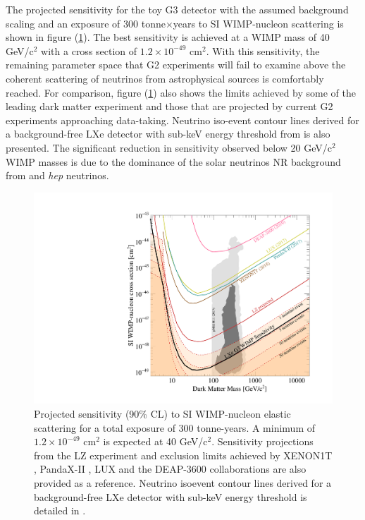 The projected sensitivity for the toy G3 detector with the assumed background scaling and an exposure of 300 tonne$\times$years to SI WIMP-nucleon scattering is shown in figure (\ref{Fig:si_wimp_sensitivity}). The best sensitivity is achieved at a WIMP mass of 40 GeV/c$^{2}$ with a cross section of $1.2 \times 10^{-49}$ cm$^{2}$. With this sensitivity, the remaining parameter space that G2 experiments will fail to examine above the coherent scattering of neutrinos from astrophysical sources is comfortably reached. For comparison, figure (\ref{Fig:si_wimp_sensitivity}) also shows the limits achieved by some of the leading dark matter experiment and those that are projected by current G2 experiments approaching data-taking. Neutrino iso-event contour lines derived for a background-free LXe detector with sub-keV energy threshold from \cite{Billard_2014} is also presented. The significant reduction in sensitivity observed below 20 GeV/c$^{2}$ WIMP masses is due to the dominance of the solar neutrinos NR background from \BE{} and \textit{hep} neutrinos. 


\begin{figure}[h!]
    \centerline{\includegraphics[width=\linewidth]{Chapter_6/Figures/g3dm_si_vs_mass.pdf}}
    \caption{Projected sensitivity (90\% CL) to SI WIMP-nucleon elastic scattering for a total exposure of 300 tonne-years. A minimum of $1.2 \times 10^{-49}$ cm$^{2}$ is expected at 40 GeV/c$^{2}$. Sensitivity projections from the LZ experiment \cite{lz} and exclusion limits achieved by XENON1T \cite{Dark Matter Search Results from a One Ton}, PandaX-II \cite{pandax_limit}, LUX \cite{Akerib:2017kat} and the DEAP-3600 \cite{DEAP_3600} collaborations are also provided as a reference. Neutrino isoevent contour lines derived for a background-free LXe detector with sub-keV energy threshold is detailed in \cite{neutrino_floor}.}
    \label{Fig:si_wimp_sensitivity}
\end{figure}

\newpage